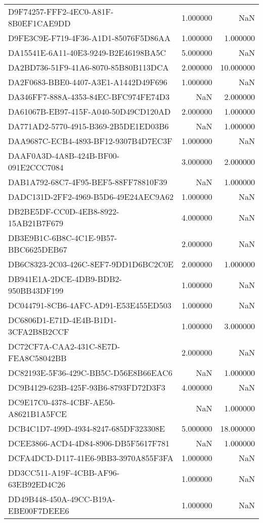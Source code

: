 \begin{tabular}{lrr}
D9F74257-FFF2-4EC0-A81F-8B0EF1CAE9DD & 1.000000 & NaN \\
D9FE3C9E-F719-4F36-A1D1-85076F5D86AA & 1.000000 & 1.000000 \\
DA15541E-6A11-40E3-9249-B2E46198BA5C & 5.000000 & NaN \\
DA2BD736-51F9-41A6-8070-85B80B113DCA & 2.000000 & 10.000000 \\
DA2F0683-BBE0-4407-A3E1-A1442D49F696 & 1.000000 & NaN \\
DA346FF7-888A-4353-84EC-BFC974FE74D3 & NaN & 2.000000 \\
DA61067B-EB97-415F-A040-50D49CD120AD & 2.000000 & 1.000000 \\
DA771AD2-5770-4915-B369-2B5DE1ED03B6 & NaN & 1.000000 \\
DAA9687C-ECB4-4893-BF12-9307B4D7EC3F & 1.000000 & NaN \\
DAAF0A3D-4A8B-424B-BF00-091E2CCC7084 & 3.000000 & 2.000000 \\
DAB1A792-68C7-4F95-BEF5-88FF78810F39 & NaN & 1.000000 \\
DADC131D-2FF2-4969-B5D6-49E24AEC9A62 & 1.000000 & NaN \\
DB2BE5DF-CC0D-4EB8-8922-15AB21B7F679 & 4.000000 & NaN \\
DB3E9B1C-6B8C-4C1E-9B57-BBC6625DEB67 & 2.000000 & NaN \\
DB6C8323-2C03-426C-8EF7-9DD1D6BC2C0E & 2.000000 & 1.000000 \\
DB941E1A-2DCE-4DB9-BDB2-950BB43DF199 & 1.000000 & NaN \\
DC044791-8CB6-4AFC-AD91-E53E455ED503 & 1.000000 & NaN \\
DC6806D1-E71D-4E4B-B1D1-3CFA2B8B2CCF & 1.000000 & 3.000000 \\
DC72CF7A-CAA2-431C-8E7D-FEA8C58042BB & 2.000000 & NaN \\
DC82193E-5F36-429C-BB5C-D56E8B66EAC6 & NaN & 1.000000 \\
DC9B4129-623B-425F-93B6-8793FD72D3F3 & 4.000000 & NaN \\
DC9E17C0-4378-4CBF-AE50-A8621B1A5FCE & NaN & 1.000000 \\
DCB4C1D7-499D-4934-8247-685DF323308E & 5.000000 & 18.000000 \\
DCEE3866-ACD4-4D84-8906-DB5F5617F781 & NaN & 1.000000 \\
DCFA4DCD-D117-41E6-9BB3-3970A855F3FA & 1.000000 & NaN \\
DD3CC511-A19F-4CBB-AF96-63EB92ED4C26 & 1.000000 & NaN \\
DD49B448-450A-49CC-B19A-EBE00F7DEEE6 & 1.000000 & NaN \\

\end{tabular}
